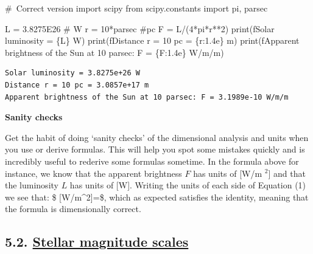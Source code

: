 \documentclass[
  letterpaper,
  DIV=11,
  numbers=noendperiod]{scrartcl}
\newenvironment{Shaded}{\begin{snugshade}}{\end{snugshade}}
\newcommand{\BuiltInTok}[1]{\textcolor[rgb]{0.00,0.23,0.31}{#1}}
\newcommand{\CommentTok}[1]{\textcolor[rgb]{0.37,0.37,0.37}{#1}}
\newcommand{\DecValTok}[1]{\textcolor[rgb]{0.68,0.00,0.00}{#1}}
\newcommand{\FloatTok}[1]{\textcolor[rgb]{0.68,0.00,0.00}{#1}}
\newcommand{\ImportTok}[1]{\textcolor[rgb]{0.00,0.46,0.62}{#1}}
\newcommand{\NormalTok}[1]{\textcolor[rgb]{0.00,0.23,0.31}{#1}}
\newcommand{\OperatorTok}[1]{\textcolor[rgb]{0.37,0.37,0.37}{#1}}
\newcommand{\SpecialCharTok}[1]{\textcolor[rgb]{0.37,0.37,0.37}{#1}}
\newcommand{\SpecialStringTok}[1]{\textcolor[rgb]{0.13,0.47,0.30}{#1}}
\begin{document}
\begin{Shaded}
\begin{Highlighting}[]
\CommentTok{\# Correct version}
\ImportTok{import}\NormalTok{ scipy}
\ImportTok{from}\NormalTok{ scipy.constants }\ImportTok{import}\NormalTok{ pi, parsec}

\NormalTok{L }\OperatorTok{=} \FloatTok{3.8275E26} \CommentTok{\# W}
\NormalTok{r }\OperatorTok{=} \DecValTok{10}\OperatorTok{*}\NormalTok{parsec }\CommentTok{\#pc}
\NormalTok{F }\OperatorTok{=}\NormalTok{ L}\OperatorTok{/}\NormalTok{(}\DecValTok{4}\OperatorTok{*}\NormalTok{pi}\OperatorTok{*}\NormalTok{r}\OperatorTok{**}\DecValTok{2}\NormalTok{)}
\BuiltInTok{print}\NormalTok{(}\SpecialStringTok{f\textquotesingle{}Solar luminosity = }\SpecialCharTok{\{}\NormalTok{L}\SpecialCharTok{\}}\SpecialStringTok{ W\textquotesingle{}}\NormalTok{)}
\BuiltInTok{print}\NormalTok{(}\SpecialStringTok{f\textquotesingle{}Distance r = 10 pc = }\SpecialCharTok{\{}\NormalTok{r}\SpecialCharTok{:1.4e\}}\SpecialStringTok{ m\textquotesingle{}}\NormalTok{)}
\BuiltInTok{print}\NormalTok{(}\SpecialStringTok{f\textquotesingle{}Apparent brightness of the Sun at 10 parsec: F = }\SpecialCharTok{\{}\NormalTok{F}\SpecialCharTok{:1.4e\}}\SpecialStringTok{ W/m/m\textquotesingle{}}\NormalTok{)}
\end{Highlighting}
\end{Shaded}

\begin{verbatim}
Solar luminosity = 3.8275e+26 W
Distance r = 10 pc = 3.0857e+17 m
Apparent brightness of the Sun at 10 parsec: F = 3.1989e-10 W/m/m
\end{verbatim}

\textbf{Sanity checks}

Get the habit of doing `sanity checks' of the dimensional analysis and
units when you use or derive formulas. This will help you spot some
mistakes quickly and is incredibly useful to rederive some formulas
sometime. In the formula above for instance, we know that the apparent
brightness \(F\) has units of {[}W/m \(^2\){]} and that the luminosity
\(L\) has units of {[}W{]}. Writing the units of each side of Equation
(1) we see that: \$ {[}W/m\^{}2{]}=\dfrac{[W]}{[m^2]}\$, which as
expected satisfies the identity, meaning that the formula is
dimensionally correct.

\hypertarget{stellar-magnitude-scales}{%
\subsection{\texorpdfstring{5.2. \protect\hyperlink{toc0_}{Stellar
magnitude
scales}}{5.2. Stellar magnitude scales}}\label{stellar-magnitude-scales}}
\end{document}
